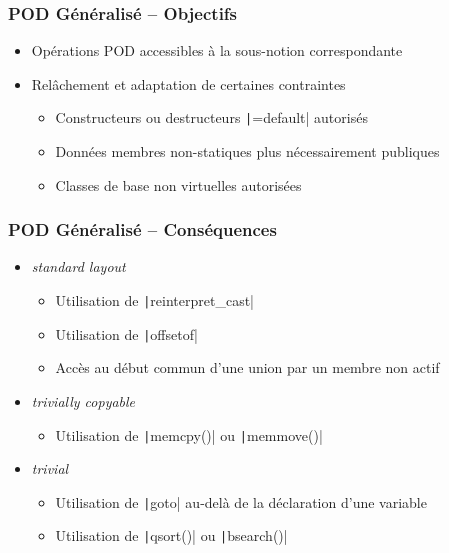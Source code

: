 \documentclass[C++.tex]{subfiles}
\begin{document}
\begin{frame}[fragile]
	\frametitle{POD Généralisé -- Objectifs}
	\begin{itemize}
		\item Opérations POD accessibles à la sous-notion correspondante
		\item Relâchement et adaptation de certaines contraintes
		\begin{itemize}
			\item Constructeurs ou destructeurs \texttt|=default| autorisés
			\item Données membres non-statiques plus nécessairement publiques


			\item Classes de base non virtuelles autorisées

		\end{itemize}
	\end{itemize}
\end{frame}

\begin{frame}[fragile]
	\frametitle{POD Généralisé -- Conséquences}
	\begin{itemize}
		\item \textit{standard layout}
		\begin{itemize}
			\item Utilisation de \texttt|reinterpret_cast|
			\item Utilisation de \texttt|offsetof|
			\item Accès au début commun d'une union par un membre non actif
		\end{itemize}

		\item \textit{trivially copyable}
		\begin{itemize}
			\item Utilisation de \texttt|memcpy()| ou \texttt|memmove()|
		\end{itemize}

		\item \textit{trivial}
		\begin{itemize}
			\item Utilisation de \texttt|goto| au-delà de la déclaration d'une variable
			\item Utilisation de \texttt|qsort()| ou \texttt|bsearch()|
		\end{itemize}
	\end{itemize}
\end{frame}
\end{document}
